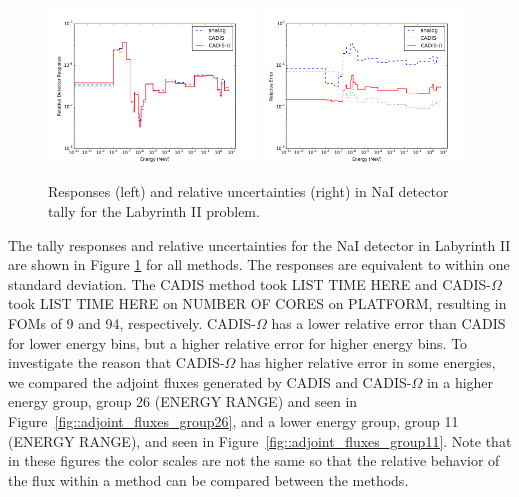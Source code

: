 \documentclass[12pt]{article}
\begin{document}
\begin{figure}
  \begin{center}
    \includegraphics[width=0.49\textwidth]{./images/maze2_spectra.png}
    \includegraphics[width=0.49\textwidth]{./images/maze2_RE.png}
    \caption[]{\label{fig::tallyresponse} Responses (left) and relative uncertainties (right) in NaI detector tally for the Labyrinth II problem. }
  \end{center}
\end{figure}

The tally responses and relative uncertainties for the NaI detector in Labyrinth II are shown in Figure \ref{fig::tallyresponse} for all methods. 
The responses are equivalent to within one standard deviation. 
The CADIS method took LIST TIME HERE and CADIS-$\Omega$ took LIST TIME HERE on NUMBER OF CORES on PLATFORM, resulting in FOMs of 9 and 94, respectively.
CADIS-$\Omega$ has a lower relative error than CADIS for lower energy bins, but a higher relative error for higher energy bins. 
To investigate the reason that CADIS-$\Omega$ has higher relative error in some energies, we compared the adjoint fluxes generated by CADIS and CADIS-$\Omega$ in a higher energy group, group 26 (ENERGY RANGE) and seen in Figure~\ref{fig::adjoint_fluxes_group26}, and a lower energy group, group 11 (ENERGY RANGE), and seen in Figure~\ref{fig::adjoint_fluxes_group11}.
Note that in these figures the color scales are not the same so that the relative behavior of the flux within a method can be compared between the methods. 
\end{document}
